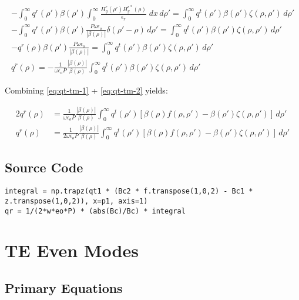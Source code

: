 \documentclass[11pt, oneside]{article}   	%
\begin{document}
\begin{align}
-\int_{0}^{\infty} q^{r}(\rho ') \beta(\rho ') \int_{0}^{\infty} \frac{H_{y}^{r}(\rho ') H_{y}^{r*}(\rho)}{\epsilon_{r}} \; dx \, d\rho '= \int_{0}^{\infty} q^{t} (\rho ') \beta(\rho ') \zeta(\rho, \rho ') \, d\rho ' \nonumber \\
-\int_{0}^{\infty} q^{r}(\rho ') \beta(\rho ') \frac{P \omega \epsilon_{o}}{|\beta(\rho)|}\delta(\rho '-\rho) \, d\rho '
= \int_{0}^{\infty} q^{t} (\rho ') \beta(\rho ') \zeta(\rho, \rho ') \, d\rho ' \nonumber \\
-q^{r}(\rho ) \beta(\rho ') \frac{P \omega \epsilon_{o}}{|\beta(\rho)|} = \int_{0}^{\infty} q^{t} (\rho ') \beta(\rho ')  \zeta(\rho, \rho ') \, d\rho ' \nonumber \\
q^{r}(\rho ) = -\frac{1}{\omega \epsilon_{o} P} \frac{|\beta(\rho)|}{\beta(\rho)}\int_{0}^{\infty} q^{t} (\rho ') \beta(\rho ') \zeta(\rho, \rho ') \, d\rho '
\label{eq:qt-tm-2}
\end{align}

Combining \eqref{eq:qt-tm-1} + \eqref{eq:qt-tm-2} yields:

\begin{align}
2 q^{r}(\rho ) &= \frac{1}{\omega \epsilon_{o} P} \frac{|\beta(\rho)|}{\beta(\rho)}\int_{0}^{\infty} q^{t} (\rho ') [\beta(\rho) f(\rho, \rho ') - \beta(\rho ') \zeta(\rho, \rho ')] \, d\rho ' \nonumber \\
q^{r}(\rho ) &= \frac{1}{2 \omega \epsilon_{o} P} \frac{|\beta(\rho)|}{\beta(\rho)}\int_{0}^{\infty} q^{t} (\rho ') [\beta(\rho) f(\rho, \rho ') - \beta(\rho ') \zeta(\rho, \rho ')] \, d\rho '
\end{align}

\subsection{Source Code}

\begin{lstlisting}
integral = np.trapz(qt1 * (Bc2 * f.transpose(1,0,2) - Bc1 * z.transpose(1,0,2)), x=p1, axis=1)	
qr = 1/(2*w*eo*P) * (abs(Bc)/Bc) * integral
\end{lstlisting}

\newpage
\section{TE Even Modes}
\subsection{Primary Equations}
\end{document}
